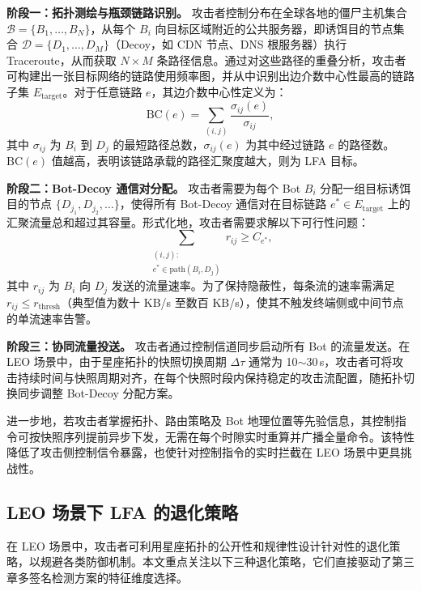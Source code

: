 \textbf{阶段一：拓扑测绘与瓶颈链路识别。} 攻击者控制分布在全球各地的僵尸主机集合 $\mathcal{B} = \{B_1, \ldots, B_N\}$，从每个 $B_i$ 向目标区域附近的公共服务器，即诱饵目的节点集合 $\mathcal{D} = \{D_1, \ldots, D_M\}$（Decoy，如 CDN 节点、DNS 根服务器）执行 Traceroute，从而获取 $N \times M$ 条路径信息。通过对这些路径的重叠分析，攻击者可构建出一张目标网络的链路使用频率图，并从中识别出边介数中心性最高的链路子集 $E_{\text{target}}$。对于任意链路 $e$，其边介数中心性定义为：
\begin{equation}
    \text{BC}(e) = \sum_{(i,j)} \frac{\sigma_{ij}(e)}{\sigma_{ij}},
\end{equation}
其中 $\sigma_{ij}$ 为 $B_i$ 到 $D_j$ 的最短路径总数，$\sigma_{ij}(e)$ 为其中经过链路 $e$ 的路径数。$\text{BC}(e)$ 值越高，表明该链路承载的路径汇聚度越大，则为 LFA 目标。

\textbf{阶段二：Bot-Decoy 通信对分配。} 攻击者需要为每个 Bot $B_i$ 分配一组目标诱饵目的节点 $\{D_{j_1}, D_{j_2}, \ldots\}$，使得所有 Bot-Decoy 通信对在目标链路 $e^* \in E_{\text{target}}$ 上的汇聚流量总和超过其容量。形式化地，攻击者需要求解以下可行性问题：
\begin{equation}
    \sum_{\substack{(i,j): \\ e^* \in \text{path}(B_i, D_j)}} r_{ij} \geq C_{e^*},
\end{equation}
其中 $r_{ij}$ 为 $B_i$ 向 $D_j$ 发送的流量速率。为了保持隐蔽性，每条流的速率需满足 $r_{ij} \leq r_{\text{thresh}}$（典型值为数十 KB/s 至数百 KB/s），使其不触发终端侧或中间节点的单流速率告警。

\textbf{阶段三：协同流量投送。} 攻击者通过控制信道同步启动所有 Bot 的流量发送。在 LEO 场景中，由于星座拓扑的快照切换周期 $\Delta\tau$ 通常为 10$\sim$30\,s，攻击者可将攻击持续时间与快照周期对齐，在每个快照时段内保持稳定的攻击流配置，随拓扑切换同步调整 Bot-Decoy 分配方案。

进一步地，若攻击者掌握拓扑、路由策略及 Bot 地理位置等先验信息，其控制指令可按快照序列提前异步下发，无需在每个时隙实时重算并广播全量命令。该特性降低了攻击侧控制信令暴露，也使针对控制指令的实时拦截在 LEO 场景中更具挑战性。

\subsection{LEO 场景下 LFA 的退化策略}

在 LEO 场景中，攻击者可利用星座拓扑的公开性和规律性设计针对性的退化策略，以规避各类防御机制。本文重点关注以下三种退化策略，它们直接驱动了第三章多签名检测方案的特征维度选择。

